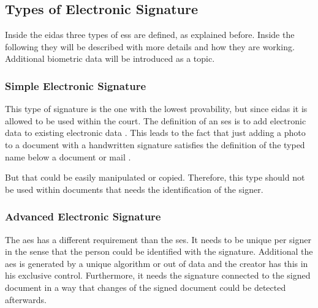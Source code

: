 \subsection{Types of Electronic Signature}\label{subsec:typesES}
Inside the \gls{eidas} three types of \glspl{es} are defined, as explained before. Inside the following they will be described with more details and how they are working. Additional biometric data will be introduced as a topic.

\subsubsection{Simple Electronic Signature}
This type of signature is the one with the lowest provability, but since \gls{eidas} it is allowed to be used within the court. The definition of an \gls{ses} is to add electronic data to existing electronic data \parencite[Article 3]{eIDAS2014}. This leads to the fact that just adding a photo to a document with a handwritten signature satisfies the definition of the typed name below a document or mail \parencite{CEFd2018}.

But that could be easily manipulated or copied. Therefore, this type should not be used within documents that needs the identification of the signer.

\subsubsection{Advanced Electronic Signature}
The \gls{aes} has a different requirement than the \gls{ses}. It needs to be unique per signer in the sense that the person could be identified with the signature. Additional the \gls{aes} is generated by a unique algorithm or out of data  and the creator has this in his exclusive control. Furthermore, it needs the signature connected to the signed document in a way that changes of the signed document could be detected afterwards. \parencite[Article 26]{eIDAS2014}

